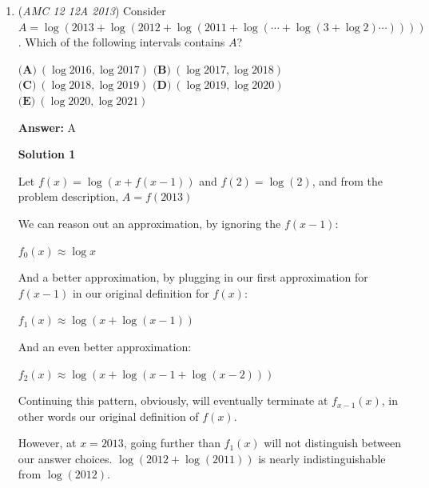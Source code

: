 \begin{enumerate}
 
Thus, we only have to consider $x \succ_1 y\succ_1 z \succ_2 x$. Something like $x \succ_2 y \succ_1 z \succ_1 x$ is just a rotation of this case.

 
Here, we start with $0<x-y\le 9$, $0<y-z\le 9$, and $x-z > 9$. We begin with casework on $z$, since it is the smallest.

 
When $z=1$, $x$ can range from $[11,19]$. There are $9+8+7+6+5+4+3+2+1 = 45$ different values for $y$ as x ranges across $11-19$.

 
When $z=2$, $x$ can range from $[12-19]$. There are $9+8+7+6+5+4+3+2 = 44$ different values for $y$ as x ranges across $12-19$.

 
Continuing this pattern, we get the sum $45+44+42+39+35+30+24+17+9 = 285$. Multiplying by three to count for rotations, we get $\boxed{(\textbf{B}) 855}$.

 -skibbysiggy

 


	\item (\textit{AMC 12 12A 2013}) Consider $A = \log (2013 + \log (2012 + \log (2011 + \log (\cdots + \log (3 + \log 2) \cdots ))))$. Which of the following intervals contains $A$?


 $\textbf{(A)} \ (\log 2016, \log 2017)$
$\textbf{(B)} \ (\log 2017, \log 2018)$
$\textbf{(C)} \ (\log 2018, \log 2019)$
$\textbf{(D)} \ (\log 2019, \log 2020)$
$\textbf{(E)} \ (\log 2020, \log 2021)$

 \textbf{Answer: }A



\textbf{Solution 1}

Let $f(x) = \log(x + f(x-1))$ and $f(2) = \log(2)$, and from the problem description, $A = f(2013)$

 We can reason out an approximation, by ignoring the $f(x-1)$:

 $f_{0}(x) \approx \log x$

 And a better approximation, by plugging in our first approximation for $f(x-1)$ in our original definition for $f(x)$:

 $f_{1}(x) \approx \log(x + \log(x-1))$

 And an even better approximation:

 $f_{2}(x) \approx \log(x + \log(x-1 + \log(x-2)))$

 Continuing this pattern, obviously, will eventually terminate at $f_{x-1}(x)$, in other words our original definition of $f(x)$.

 However, at $x = 2013$, going further than $f_{1}(x)$ will not distinguish between our answer choices. $\log(2012 + \log(2011))$ is nearly indistinguishable from $\log(2012)$.


\end{enumerate}
